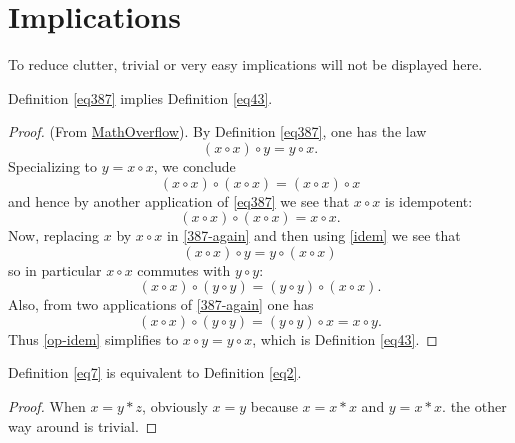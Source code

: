 \chapter{Implications}

To reduce clutter, trivial or very easy implications will not be displayed here.

\begin{theorem}[387 implies 43]\label{387_implies_43}\leanok  Definition \ref{eq387} implies Definition \ref{eq43}.
\end{theorem}

\begin{proof}\leanok (From \href{https://mathoverflow.net/a/450905/766}{MathOverflow}).
  By Definition \ref{eq387}, one has the law
\begin{equation}\label{387-again}
  (x \circ x) \circ y = y \circ x.
\end{equation}
Specializing to $y=x \circ x$, we conclude
$$(x \circ x) \circ (x \circ x) = (x \circ x) \circ x$$
and hence by another application of \eqref{eq387} we see that $x \circ x$ is idempotent:
\begin{equation}\label{idem}
  (x \circ x) \circ (x \circ x) = x \circ x.
\end{equation}
Now, replacing $x$ by $x \circ x$ in \eqref{387-again} and then using \eqref{idem} we see that
$$ (x \circ x) \circ y = y \circ (x \circ x)$$
so in particular $x \circ x$ commutes with $y \circ y$:
\begin{equation}\label{op-idem} (x \circ x) \circ (y \circ y) = (y \circ y) \circ (x \circ x).
\end{equation}
Also, from two applications of \eqref{387-again} one has
$$(x \circ x) \circ (y \circ y) = (y \circ y) \circ x = x \circ y.$$
Thus \eqref{op-idem} simplifies to $x \circ y = y \circ x$, which is Definition \ref{eq43}.
\end{proof}

\begin{theorem}[7 equivalent to 2]\label{7_equiv_2}\leanok  Definition \ref{eq7} is equivalent to Definition \ref{eq2}.
\end{theorem}

\begin{proof}
  When $x = y * z$, obviously $x = y$ because $x = x * x$ and $y = x * x$. the other way around is trivial.
\end{proof}


